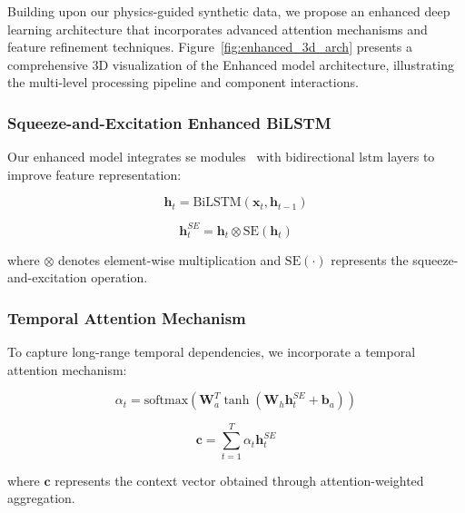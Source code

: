 \documentclass[journal]{IEEEtran}
\begin{document}
Building upon our physics-guided synthetic data, we propose an enhanced deep learning architecture that incorporates advanced attention mechanisms and feature refinement techniques. Figure~\ref{fig:enhanced_3d_arch} presents a comprehensive 3D visualization of the Enhanced model architecture, illustrating the multi-level processing pipeline and component interactions.

\subsubsection{Squeeze-and-Excitation Enhanced BiLSTM}

Our enhanced model integrates \gls{se} modules~\cite{se_networks2018} with bidirectional \gls{lstm} layers to improve feature representation:

\begin{equation}
\mathbf{h}_t = \text{BiLSTM}(\mathbf{x}_t, \mathbf{h}_{t-1})
\end{equation}

\begin{equation}
\mathbf{h}_t^{SE} = \mathbf{h}_t \otimes \text{SE}(\mathbf{h}_t)
\end{equation}

where $\otimes$ denotes element-wise multiplication and $\text{SE}(\cdot)$ represents the squeeze-and-excitation operation.

\subsubsection{Temporal Attention Mechanism}

To capture long-range temporal dependencies, we incorporate a temporal attention mechanism:

\begin{equation}
\alpha_t = \text{softmax}(\mathbf{W}_a^T \tanh(\mathbf{W}_h \mathbf{h}_t^{SE} + \mathbf{b}_a))
\end{equation}

\begin{equation}
\mathbf{c} = \sum_{t=1}^{T} \alpha_t \mathbf{h}_t^{SE}
\end{equation}

where $\mathbf{c}$ represents the context vector obtained through attention-weighted aggregation.
\end{document}
